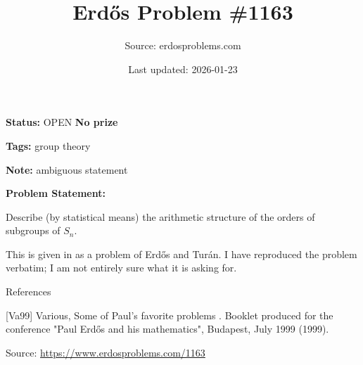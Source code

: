 \documentclass{article}
\title{Erd\H{o}s Problem \#1163}
\date{Last updated: 2026-01-23}
\author{Source: erdosproblems.com}
\begin{document}
\maketitle

\noindent\textbf{Status:} OPEN \quad \textbf{No prize}

\noindent\textbf{Tags:} group theory

\medskip
\noindent\textbf{Note:} ambiguous statement

\medskip

\noindent\textbf{Problem Statement:}

Describe (by statistical means) the arithmetic structure of the orders of subgroups of $S_n$.




This is given in \cite{Va99} as a problem of Erd\H{o}s and Tur\'{a}n. I have reproduced the problem verbatim; I am not entirely sure what it is asking for.




References

[Va99] Various, Some of Paul's favorite problems . Booklet produced for the conference "Paul Erd\H{o}s and his mathematics", Budapest, July 1999 (1999).


\bigskip
\noindent\small{Source: \url{https://www.erdosproblems.com/1163}}
\end{document}
